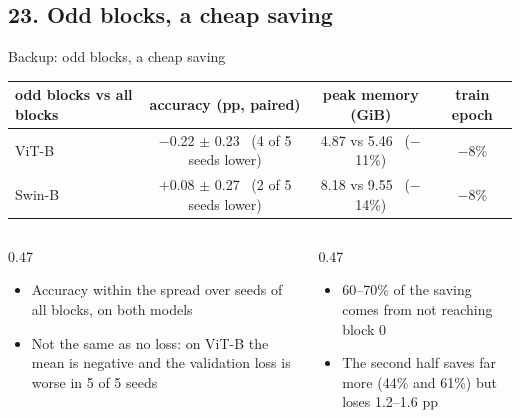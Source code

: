 \documentclass[aspectratio=169,11pt]{beamer}
\begin{document}
\subsection{23. Odd blocks, a cheap saving}
\begin{frame}{Backup: odd blocks, a cheap saving}
\small
\centering
\setlength{\tabcolsep}{4pt}
\begin{tabular}{@{}lccc@{}}
\toprule
odd blocks vs all blocks & accuracy (pp, paired) & peak memory (GiB) & train epoch \\
\midrule
ViT-B & $-$0.22 $\pm$ 0.23 \ (4 of 5 seeds lower) & 4.87 vs 5.46 \ ($-$11\%) & $-$8\% \\
Swin-B & $+$0.08 $\pm$ 0.27 \ (2 of 5 seeds lower) & 8.18 vs 9.55 \ ($-$14\%) & $-$8\% \\
\bottomrule
\end{tabular}
\par\bigskip
\begin{columns}[T]
\raggedright
\begin{column}{0.47\textwidth}
\begin{itemize}
  \item Accuracy within the spread over seeds of all blocks, on both models
  \item \alert{Not the same as no loss}: on ViT-B the mean is negative and the validation loss is worse in 5 of 5 seeds
\end{itemize}
\end{column}
\begin{column}{0.47\textwidth}
\begin{itemize}
  \item 60--70\% of the saving comes from not reaching block 0
  \item The second half saves far more (44\% and 61\%) but loses 1.2--1.6 pp
\end{itemize}
\end{column}
\end{columns}
\end{frame}
\end{document}

